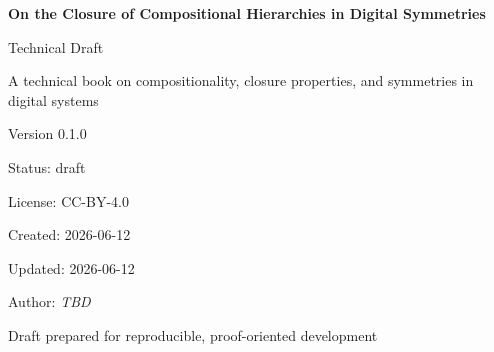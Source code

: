 \begin{titlepage}
\centering
\vspace*{1.25in}

{\Huge\bfseries On the Closure of Compositional Hierarchies in Digital Symmetries\par}
\vspace{0.35in}
{\Large Technical Draft\par}
\vspace{0.8in}

{\large A technical book on compositionality, closure properties, and symmetries in digital systems\par}
\vspace{0.85in}

{\large Version 0.1.0\par}
\vspace{0.25in}
{\large Status: draft\par}
\vspace{0.25in}
{\large License: CC-BY-4.0\par}
\vspace{0.25in}
{\large Created: 2026-06-12\par}
\vspace{0.25in}
{\large Updated: 2026-06-12\par}
\vspace{0.25in}
{\large Author: \textit{TBD}\par}

\vfill

{\large Draft prepared for reproducible, proof-oriented development\par}
\end{titlepage}

\cleardoublepage
